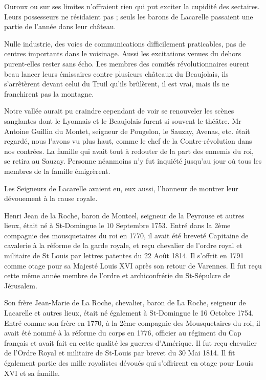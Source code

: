 Ouroux ou sur ses limites n'offraient rien qui put exciter la cupidité des sectaires. Leurs possesseurs ne résidaient pas ; seuls les barons de Lacarelle passaient une partie de l'année dans leur château.

Nulle industrie, des voies de communications difficilement praticables, pas de centres importants dans le voisinage. Aussi les excitations venues du dehors purent-elles rester sans écho. Les membres des comités révolutionnaires eurent beau lancer leurs émissaires contre plusieurs châteaux du Beaujolais, ils s'arrêtèrent devant celui du Truil qu'ils brûlèrent, il est vrai, mais ils ne franchirent pas la montagne.

Notre vallée aurait pu craindre cependant de voir se renouveler les scènes sanglantes dont le Lyonnais et le Beaujolais furent si souvent le théâtre. Mr Antoine Guillin du Montet, seigneur de Pougelon, le Sauzay, Avenas, etc. était regardé, nous l'avons vu plus haut, comme le chef de la Contre-révolution dans nos contrées. La famille qui avait tout à redouter de la part des ennemis du roi, se retira au Sauzay. Personne néanmoins n'y fut inquiété jusqu'au jour où tous les membres de la famille émigrèrent.

Les Seigneurs de Lacarelle avaient eu, eux aussi, l'honneur de montrer leur dévouement à la cause royale.

Henri Jean de la Roche, baron de Montcel, seigneur de la Peyrouse et autres lieux, était né à St-Domingue le 10 Septembre 1753. Entré dans la 2ème compagnie des mousquetaires du roi en 1770, il avait été breveté Capitaine de cavalerie à la réforme de la garde royale, et reçu chevalier de l'ordre royal et militaire de St Louis par lettres patentes du 22 Août 1814. Il s'offrit en 1791 comme otage pour sa Majesté Louis XVI après son retour de Varennes. Il fut reçu cette même année membre de l'ordre et archiconfrérie du St-Sépulcre de Jérusalem.

Son frère Jean-Marie de La Roche, chevalier, baron de La Roche, seigneur de Lacarelle et autres lieux, était né également à St-Domingue le 16 Octobre 1754. Entré comme son frère en 1770, à la 2ème compagnie des Mousquetaires du roi, il avait été nommé à la réforme du corps en 1776, officier au régiment du Cap français et avait fait
en cette qualité les guerres d'Amérique. Il fut reçu chevalier de l'Ordre Royal et militaire de St-Louis par brevet du 30 Mai 1814. Il fit également partie des mille royalistes dévoués qui s'offrirent en otage pour Louis XVI et sa famille.

